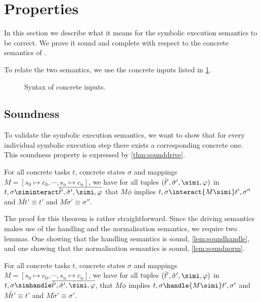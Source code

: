 


\section{Properties}
\label{sec:properties}

In this section we describe what it means for the symbolic execution semantics to be correct.
We prove it sound and complete with respect to the concrete semantics of \TOPHAT.

To relate the two semantics, we use the concrete inputs listed in \cref{fig:inputsConcrete}.

\begin{figure}[h]
  \caption{Syntax of concrete inputs.}
  \label{fig:inputsConcrete}
\end{figure}


\subsection{Soundness}
\label{sec:soundess}


To validate the symbolic execution semantics,
we want to show that for every individual symbolic execution step there exists a corresponding concrete one.
This soundness property is expressed by \cref{thm:sounddrive}.

\begin{theorem}
  \label{thm:sounddrive}

  For all concrete tasks $t$, concrete states $\sigma$ and mappings $M=[s_0\mapsto c_0,\cdots,s_n\mapsto c_n]$,
    we have for all tuples $(\tilde{t}',\tilde{\sigma}',\simi,\phi)$ in $t,\sigma\siminteract \overline{\tilde{t}',\tilde{\sigma}',\simi,\phi}$ that
    $M\phi$ implies
    $t,\sigma \interact{M \simi} t',\sigma''$ and $M\tilde{t}' \equiv t'$ and $M\tilde{\sigma}' \equiv \sigma''$.
\end{theorem}

The proof for this theorem is rather straightforward.
Since the driving semantics makes use of the handling and the normalisation semantics, we require two lemmas.
One showing that the handling semantics is sound, \cref{lem:soundhandle}, and one showing that the normalisation semantics is sound, \cref{lem:soundnorm}.

\begin{lemma}
  \label{lem:soundhandle}

  For all concrete tasks $t$, concrete states $\sigma$ and mappings $M = [s_0\mapsto c_0,\cdots,s_n\mapsto c_n]$,
    we have for all tuples $(\tilde{t}',\tilde{\sigma}',\simi,\phi)$ in
    $t,\sigma\simhandle \overline{\tilde{t}',\tilde{\sigma}',\simi,\phi}$,
    that $M\phi$ implies
    $t,\sigma \handle{M \simi} t',\sigma'$ and $M\tilde{t}' \equiv t' $ and $M\tilde{\sigma}' \equiv \sigma'$.
\end{lemma}

